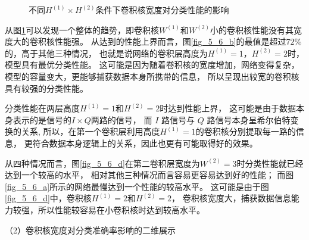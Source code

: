 \begin{figure}[!h]
	\caption{不同$H^{(1)} \times H^{(2)}$条件下卷积核宽度对分类性能的影响}
	\label{fig_5_6}
\end{figure}

从图\ref{fig_5_6}可以发现一个整体的趋势，即卷积核$W^{(1)}$和$W^{(2)}$小的卷积核性能没有其宽度大的卷积核性能强。
从达到的性能上界而言，图\ref{fig_5_6_b}的最值是超过$72\%$的，高于其他三种情况，
也就是说网络的卷积层高度为$H^{(1)} = 1$，$H^{(2)} = 2$时，模型具有最优分类性能。
这可能是因为随着卷积核的宽度增加，网络变得复杂，模型的容量变大，更能够捕获数据本身所携带的信息，
所以呈现出较宽的卷积核具有较强的分类性能。\par

分类性能在两层高度$H^{(1)}=1$和$H^{(2)}=2$时达到性能上界，
这可能是由于数据本身表示的是信号的$I \times Q$两路的信号，
而 $I$ 路信号与 $Q$ 路信号本身呈希尔伯特变换的关系,
所以，在第一个卷积层利用高度$H^{(1)}=1$的卷积核分别提取每一路的信息，
更符合数据本身逻辑上的关系，因此也更有可能取得好的效果。
\par

从四种情况而言，图\ref{fig_5_6_d}在第二卷积层宽度为$W^{(2)}=3$时分类性能就已经达到一个较高的水平，
相对其他三种情况而言容易更容易达到好的性能；
而图\ref{fig_5_6_a}所示的网络最慢达到一个性能的较高水平。
这可能是由于图\ref{fig_5_6_d}中，卷积核$H^{(1)}=2$和$H^{(2)}=2$，
卷积核宽度大，捕获数据信息能力较强，所以性能较容易在小卷积核时达到较高水平。\par

（2）卷积核宽度对分类准确率影响的二维展示\par 

